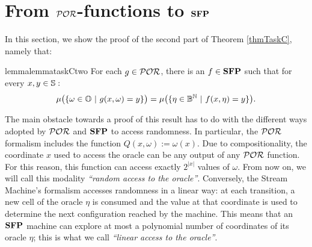 \section{From $\mathcal{POR}$-functions
to $\mathbf{SFP}$}
\label{sec:PORtoSFP}

In this section, we show the proof of the second part of Theorem
\ref{thmTaskC}, namely that:

\begin{restatable}{lemma}{lemmataskCtwo}
  \label{lemma:taskC2}
  For each $g\in \mathcal{POR}$, there is an  $f \in \mathbf{SFP}$ such that for every $x,y\in \mathbb{S}:$
  $$
  \mu\big(\{\omega \in \mathbb{O} \ | \ g(x,\omega) = y\}\big) = \mu\big(\{\eta \in \mathbb{B}^{\mathbb{N}} \ | \  f(x, \eta) = y\}\big).
  $$
\end{restatable}

The main obstacle towards a proof of this result has to do with the different ways adopted by
$\mathcal{POR}$ and $\mathbf{SFP}$ to access randomness.
In particular, the $\mathcal{POR}$ formalism includes the function
$Q(x, \omega) := \omega(x)$.
Due to compositionality, the
coordinate $x$ used to access the oracle
can be any output of any $\mathcal{POR}$ function.
For this reason, this function can access
exactly $2^{|x|}$ values of $\omega$. From now on,
we will call this modality \emph{``random access to the oracle''}.
Conversely, the Stream Machine's formalism accesses randomness in a linear way:
at each transition, a new cell of the oracle $\eta$ is consumed and the value
at that coordinate is used to determine the next configuration reached by the
machine.
This means that an $\mathbf{SFP}$ machine can explore at most a polynomial number
of coordinates of its oracle $\eta$; this is what we call
\emph{``linear access to the oracle''}.

